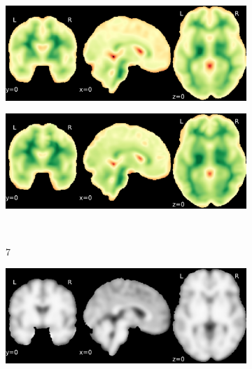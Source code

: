 \documentclass{article}
\begin{document}
\begin{appendices}
\begin{landscape}
\begin{figure}
\begin{subfigure}[t]{0.2\paperheight}
            \end{subfigure}
            \begin{subfigure}[t]{0.2\paperheight}
                \centering
                \includegraphics[width=\textwidth]{figures/sig/10mm/rs_ds001748_sub-adult16_sig.pdf}
            \end{subfigure}
            \begin{subfigure}[t]{0.2\paperheight}
                \centering
                \includegraphics[width=\textwidth]{figures/sig/10mm/rr.rs_ds001748_sub-adult16_sig.pdf}
            \end{subfigure} \\
            \begin{subfigure}[b][][c]{0.01\paperwidth} 7 \vspace*{15pt} \end{subfigure}
            \begin{subfigure}[t]{0.2\paperheight}
                \centering
                \includegraphics[width=\textwidth]{figures/sig/10mm/ieee_ds002338_sub-xp201.pdf}

\end{subfigure}
\end{figure}
\end{landscape}
\end{appendices}
\end{document}
